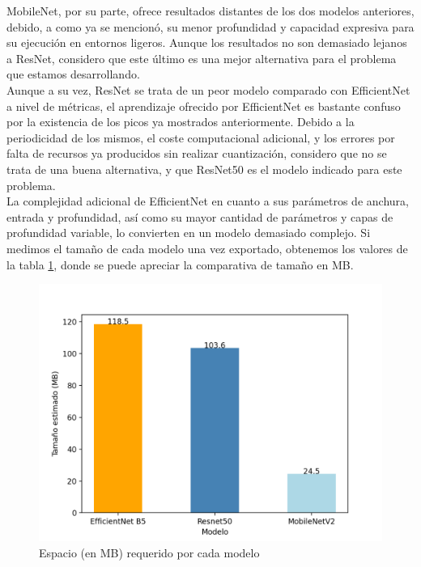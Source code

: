 MobileNet, por su parte, ofrece resultados distantes de los dos modelos anteriores, debido, a como ya se mencionó, su menor profundidad y capacidad expresiva para su ejecución en entornos ligeros. Aunque los resultados no son demasiado lejanos a ResNet, considero que este último es una mejor alternativa para el problema que estamos desarrollando.\\

Aunque a su vez, ResNet se trata de un peor modelo comparado con EfficientNet a nivel de métricas, el aprendizaje ofrecido por EfficientNet es bastante confuso por la existencia de los picos ya mostrados anteriormente. Debido a la periodicidad de los mismos, el coste computacional adicional, y los errores por falta de recursos ya producidos sin realizar cuantización, considero que no se trata de una buena alternativa, y que ResNet50 es el modelo indicado para este problema.\\

La complejidad adicional de EfficientNet en cuanto a sus parámetros de anchura, entrada y profundidad, así como su mayor cantidad de parámetros y capas de profundidad variable, lo convierten en un modelo demasiado complejo. Si medimos el tamaño de cada modelo una vez exportado, obtenemos los valores de la tabla \ref{fig:tam}, donde se puede apreciar la comparativa de tamaño en MB.

\begin{figure}[H]
	\centering
	\includegraphics[scale = 0.6]{imagenes/tamestimado.png}
	\caption{Espacio (en MB) requerido por cada modelo}
	\label {fig:tam}
\end{figure}

